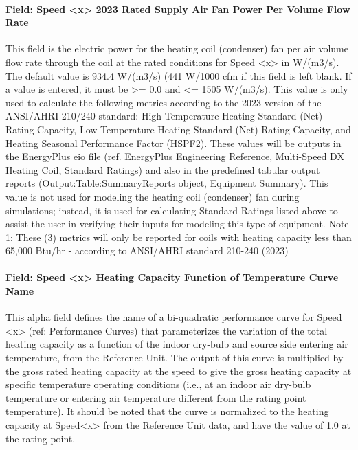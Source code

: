\paragraph{Field: Speed \textless{}x\textgreater{} 2023 Rated Supply Air Fan Power Per Volume Flow Rate}

This field is the electric power for the heating coil (condenser) fan per air volume flow rate through the coil at the rated conditions for Speed \textless{}x\textgreater{} in W/(m3/s). The default value is 934.4 W/(m3/s) (441 W/1000 cfm if this field is left blank. If a value is entered, it must be \textgreater{}= 0.0 and \textless{}= 1505 W/(m3/s). This value is only used to calculate the following metrics according to the 2023 version of the ANSI/AHRI 210/240 standard: High Temperature Heating Standard (Net) Rating Capacity, Low Temperature Heating Standard (Net) Rating Capacity, and Heating Seasonal Performance Factor (HSPF2). These values will be outputs in the EnergyPlus eio file (ref. EnergyPlus Engineering Reference, Multi-Speed DX Heating Coil, Standard Ratings) and also in the predefined tabular output reports (Output:Table:SummaryReports object, Equipment Summary). This value is not used for modeling the heating coil (condenser) fan during simulations; instead, it is used for calculating Standard Ratings listed above to assist the user in verifying their inputs for modeling this type of equipment.
Note 1: These (3) metrics will only be reported for coils with heating capacity less than 65,000 Btu/hr - according to ANSI/AHRI standard 210-240 (2023)

\paragraph{Field: Speed \textless{}x\textgreater{} Heating Capacity Function of Temperature Curve Name}\label{field-speed-x-heating-capacity-function-of-temperature-curve-name-1}

This alpha field defines the name of a bi-quadratic performance curve for Speed \textless{}x\textgreater{} (ref: Performance Curves) that parameterizes the variation of the total heating capacity as a function of the indoor dry-bulb and source side entering air temperature, from the Reference Unit. The output of this curve is multiplied by the gross rated heating capacity at the speed to give the gross heating capacity at specific temperature operating conditions (i.e., at an indoor air dry-bulb temperature or entering air temperature different from the rating point temperature). It should be noted that the curve is normalized to the heating capacity at Speed\textless{}x\textgreater{} from the Reference Unit data, and have the value of 1.0 at the rating point.

